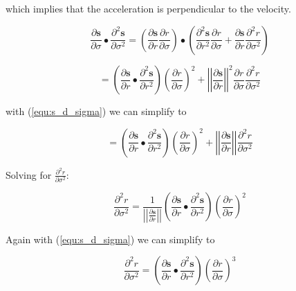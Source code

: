 \documentclass[11pt,onecolumn,a4paper,oneside,openright,final]{article}
\begin{document}
which implies that the acceleration is perpendicular to the velocity.

\begin{equation}
    \frac{\partial \mathbf{s}}{\partial \sigma} \bullet \frac{\partial^2 \mathbf{s}}{\partial \sigma^2} =
    \left(
    \frac{\partial \mathbf{s}}{\partial r} \frac{\partial r}{\partial \sigma}
    \right) \bullet \left(
    \frac{\partial^2 \mathbf{s}}{\partial r^2} \frac{\partial r}{\partial \sigma} +
    \frac{\partial \mathbf{s}}{\partial r} \frac{\partial^2 r}{\partial \sigma^2} 
    \right)
    \label{equ:perpendicular_1}
\end{equation}

\begin{equation}
    =
    \left( \frac{\partial \mathbf{s}}{\partial r} \bullet \frac{\partial^2 \mathbf{s}}{\partial r^2} \right) {\left( \frac{\partial r}{\partial \sigma} \right)}^2
    + {\left| \left| \frac{\partial \mathbf{s}}{\partial r} \right| \right|}^2 \frac{\partial r}{\partial \sigma} \frac{\partial^2 r}{\partial \sigma^2}
    \label{equ:perpendicular_2}
\end{equation}

with (\ref{equ:s_d_sigma}) we can simplify to

\begin{equation}
    =
    \left( \frac{\partial \mathbf{s}}{\partial r} \bullet \frac{\partial^2 \mathbf{s}}{\partial r^2} \right) {\left( \frac{\partial r}{\partial \sigma} \right)}^2
    + {\left| \left| \frac{\partial \mathbf{s}}{\partial r} \right| \right|} \frac{\partial^2 r}{\partial \sigma^2}
    \label{equ:perpendicular_3}
\end{equation}

Solving for $\frac{\partial^2 r}{\partial \sigma^2}$:

\begin{equation}
    \frac{\partial^2 r}{\partial \sigma^2} =
    \frac{1}{\left| \left| \frac{\partial \mathbf{s}}{\partial r} \right| \right|}
    \left( \frac{\partial \mathbf{s}}{\partial r} \bullet \frac{\partial^2 \mathbf{s}}{\partial r^2} \right) {\left( \frac{\partial r}{\partial \sigma} \right)}^2
    \label{equ:r_dd_sigma_1}
\end{equation}

Again with (\ref{equ:s_d_sigma}) we can simplify to

\begin{equation}
    \frac{\partial^2 r}{\partial \sigma^2} =
    \left( \frac{\partial \mathbf{s}}{\partial r} \bullet \frac{\partial^2 \mathbf{s}}{\partial r^2} \right) {\left( \frac{\partial r}{\partial \sigma} \right)}^3
    \label{equ:r_dd_sigma_2}
\end{equation}
\end{document}
